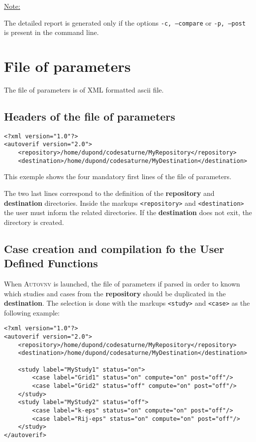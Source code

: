 \documentclass[a4paper,10pt,twoside]{article}
\begin{document}
\underline{Note:}

The detailed report is generated only if the options \texttt{-c, --compare} or \texttt{-p, --post} is present
in the command line.


\section{File of parameters}

The file of parameters is of XML formatted ascii file.

\subsection{Headers of the file of parameters}

\begin{verbatim}
<?xml version="1.0"?>
<autoverif version="2.0">
    <repository>/home/dupond/codesaturne/MyRepository</repository>
    <destination>/home/dupond/codesaturne/MyDestination</destination>
\end{verbatim}

This exemple shows the four mandatory first lines of the file of parameters.

The two last lines correspond to the definition of the \textbf{repository}
and \textbf{destination} directories.
Inside the markups \texttt{<repository>} and \texttt{<destination>} the user
must inform the related directories. If the \textbf{destination} does not exit,
the directory is created.

\subsection{Case creation and compilation fo the User Defined Functions}

When \textsc{Autovnv} is launched, the file of parameters if parsed in order to known
which studies and cases from the \textbf{repository} should be duplicated in
the \textbf{destination}. The selection is done with the markups \texttt{<study>}
and \texttt{<case>} as the following example:

\begin{verbatim}
<?xml version="1.0"?>
<autoverif version="2.0">
    <repository>/home/dupond/codesaturne/MyRepository</repository>
    <destination>/home/dupond/codesaturne/MyDestination</destination>

    <study label="MyStudy1" status="on">
        <case label="Grid1" status="on" compute="on" post="off"/>
        <case label="Grid2" status="off" compute="on" post="off"/>
    </study>
    <study label="MyStudy2" status="off">
        <case label="k-eps" status="on" compute="on" post="off"/>
        <case label="Rij-eps" status="on" compute="on" post="off"/>
    </study>
</autoverif>
\end{verbatim}
\end{document}
